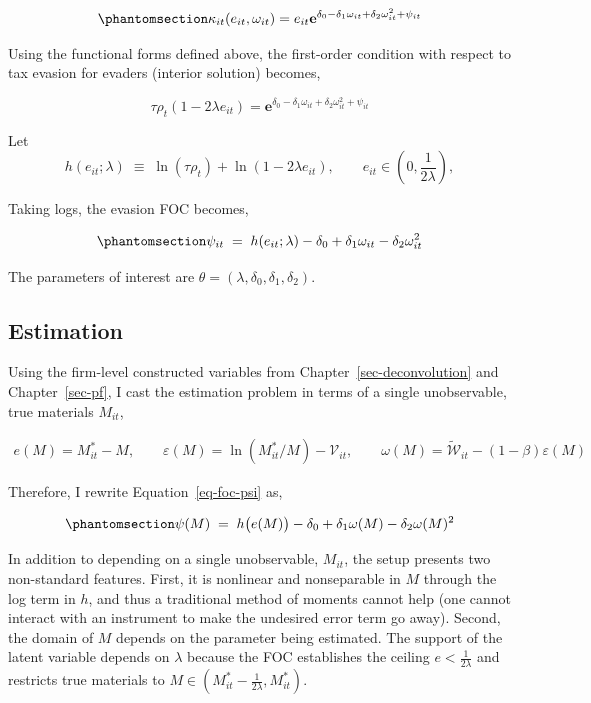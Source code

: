 \documentclass[
  12pt,
  letterpaper,
  oneside,
  openany]{report}
\begin{document}
\begin{equation}\protect\phantomsection\label{eq-eva-cost}{
\kappa_{it}(e_{it}, \omega_{it})=e_{it}\textbf{e}^{\delta_0-\delta_1\omega_{it}+\delta_2\omega^2_{it}+\psi_{it}}
}\end{equation}

Using the functional forms defined above, the first-order condition with
respect to tax evasion for evaders (interior solution) becomes,

\[
\tau\rho_t(1-2\lambda e_{it}) = \textbf{e}^{\delta_0-\delta_1\omega_{it}+\delta_2\omega^2_{it}+\psi_{it}}
\]

Let \[
h(e_{it};\lambda)\;\equiv\;\ln(\tau\rho_t)+\ln(1-2\lambda e_{it}),
\qquad e_{it}\in(0,\frac{1}{2\lambda}),
\]

Taking logs, the evasion FOC becomes,

\begin{equation}\protect\phantomsection\label{eq-foc-psi}{
\psi_{it}\;=\;h(e_{it};\lambda)-\delta_0+\delta_1\omega_{it}-\delta_2\omega^2_{it}
}\end{equation}

The parameters of interest are
\(\theta=(\lambda,\delta_0,\delta_1,\delta_2)\).

\subsection{Estimation}\label{sec-counter-estimation}

Using the firm-level constructed variables from
Chapter~\ref{sec-deconvolution} and Chapter~\ref{sec-pf}, I cast the
estimation problem in terms of a single unobservable, true materials
\(M_{it}\),

\[
\begin{aligned}
e(M)=M^*_{it}-M,\qquad 
\varepsilon(M)=\ln(M^*_{it}/M)-\mathcal V_{it},\qquad
\omega(M)=\tilde{\mathcal W}_{it}-(1-\beta)\varepsilon(M)
\end{aligned}
\]

Therefore, I rewrite Equation~\ref{eq-foc-psi} as,

\begin{equation}\protect\phantomsection\label{eq-psi-of-m}{
\psi(M)\;=\;h\big(e(M)\big)-\delta_0+\delta_1\omega(M)-\delta_2\omega(M)^2
}\end{equation}

In addition to depending on a single unobservable, \(M_{it}\), the setup
presents two non-standard features. First, it is nonlinear and
nonseparable in \(M\) through the log term in \(h\), and thus a
traditional method of moments cannot help (one cannot interact with an
instrument to make the undesired error term go away). Second, the domain
of \(M\) depends on the parameter being estimated. The support of the
latent variable depends on \(\lambda\) because the FOC establishes the
ceiling \(e<\tfrac 1{2\lambda}\) and restricts true materials to
\(M\in(M^*_{it}-\tfrac 1{2\lambda}, M^*_{it})\).
\end{document}

